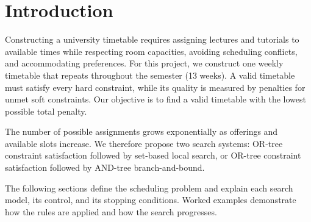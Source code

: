 \section{Introduction}
\label{sec:intro}

Constructing a university timetable requires assigning lectures and tutorials to available times while respecting room capacities, avoiding scheduling conflicts, and accommodating preferences. For this project, we construct one weekly timetable that repeats throughout the semester (13 weeks). A valid timetable must satisfy every hard constraint, while its quality is measured by penalties for unmet soft constraints. Our objective is to find a valid timetable with the lowest possible total penalty.

The number of possible assignments grows exponentially as offerings and available slots increase. We therefore propose two search systems: OR-tree constraint satisfaction followed by set-based local search, or OR-tree constraint satisfaction followed by AND-tree branch-and-bound.

The following sections define the scheduling problem and explain each search model, its control, and its stopping conditions. Worked examples demonstrate how the rules are applied and how the search progresses.